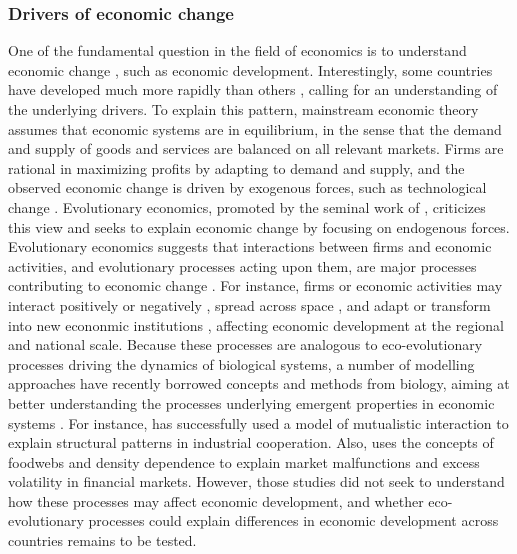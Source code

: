 \subsubsection*{Drivers of economic change}
One of the fundamental question in the field of economics is to understand economic change \cite{Nelson2014}, such as economic development. Interestingly, some countries have developed much more rapidly than others \cite{acemoglu2001colonial}, calling for an understanding of the underlying drivers.
To explain this pattern, mainstream economic theory assumes that economic systems are in equilibrium, in the sense that the demand and supply of goods and services are balanced on all relevant markets. Firms are rational in maximizing profits by adapting to demand and supply, and the observed economic change is driven by exogenous forces, such as technological change \cite{Romer1986}. Evolutionary economics, promoted by the seminal work of \cite{Nelson2014}, criticizes this view and seeks to explain economic change by focusing on endogenous forces. 
% 
Evolutionary economics suggests that interactions between firms and economic activities, and evolutionary processes acting upon them, are major processes contributing to economic change \cite{Hodgson2019}.
% 
For instance, firms or economic activities may interact positively or negatively \cite{Wernerfelt1989,Pistorius2007Ozman2009,Saavedra2009a,Cohendet2018,Menon2015}, spread across space \cite{RogersEverettM2003DoI,Zahra2000}, and adapt \cite{Cordes2006} or transform into new econonmic institutions  \cite{Freeman2002,Hodgson2004,Aldrich2008}, affecting economic development at the regional and national scale.
%
% 
Because these processes are analogous to eco-evolutionary processes driving the dynamics of biological systems, a number of modelling approaches have recently borrowed concepts and methods from biology, aiming at better understanding the processes underlying emergent properties in economic systems \cite{Tacchella2018,Saavedra2009a,Scholl2020,Zhang2018,Modis1997,Saavedra2014,Farmer1999,Michalakelis2011,Marasco2016,Gatabazi2019,Cauwels56,Applegate2021,Suweis2015}. 
% 
For instance, \cite{Saavedra2009a} has successfully used a model of mutualistic interaction to explain structural patterns in industrial cooperation.
% 
Also, \cite{Scholl2020} uses the concepts of foodwebs and density dependence to explain market malfunctions and excess volatility in financial markets.
% 
However, those studies did not seek to understand how these processes may affect economic development, and whether eco-evolutionary processes could explain differences in economic development across countries remains to be tested.


